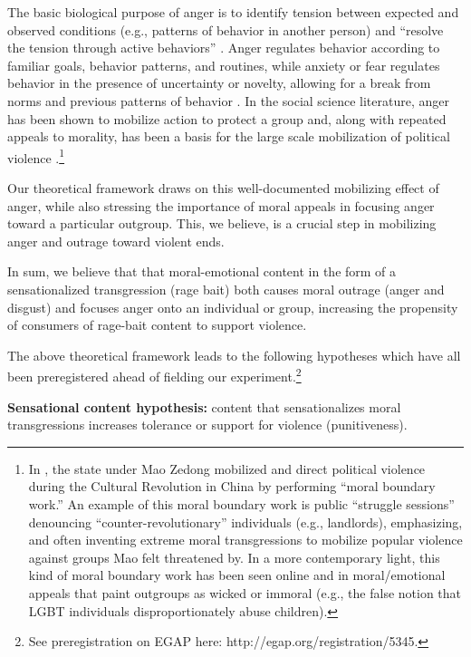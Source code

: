The basic biological purpose of anger is to identify tension between expected and observed conditions (e.g., patterns of behavior in another person) and ``resolve the tension through active behaviors'' \citep{SCARPA1997375,williams2017anger}. Anger regulates behavior according to familiar goals, behavior patterns, and routines, while anxiety or fear regulates behavior in the presence of uncertainty or novelty, allowing for a break from norms and previous patterns of behavior \citep{albertson2015anxious}. In the social science literature, anger has been shown to mobilize action to protect a group \citep{huddy2011americans, skitka2006confrontational} and, along with repeated appeals to morality, has been a basis for the large scale mobilization of political violence \citep{javed2022righteous}.\footnote{In \cite{javed2022righteous}, the state under Mao Zedong mobilized and direct political violence during the Cultural Revolution in China by performing ``moral boundary work.'' An example of this moral boundary work is public ``struggle sessions'' denouncing ``counter-revolutionary'' individuals (e.g., landlords), emphasizing, and often inventing extreme moral transgressions to mobilize popular violence against groups Mao felt threatened by. In a more contemporary light, this kind of moral boundary work has been seen online and in moral/emotional appeals that paint outgroups as wicked or immoral (e.g., the false notion that LGBT individuals disproportionately abuse children).}

Our theoretical framework draws on this well-documented mobilizing effect of anger, while also stressing the importance of moral appeals in focusing anger toward a particular outgroup. This, we believe, is a crucial step in mobilizing anger and outrage toward violent ends.

In sum, we believe that that moral-emotional content in the form of a sensationalized transgression (rage bait) both causes moral outrage (anger and disgust) and focuses anger onto an individual or group, increasing the propensity of consumers of rage-bait content to support violence.

The above theoretical framework leads to the following hypotheses which have all been preregistered ahead of fielding our experiment.\footnote{See preregistration on EGAP here: http://egap.org/registration/5345.}

\vspace{1em}
\noindent\textbf{Sensational content hypothesis:} content that sensationalizes moral transgressions increases tolerance or support for violence (punitiveness).
\vspace{1em}


